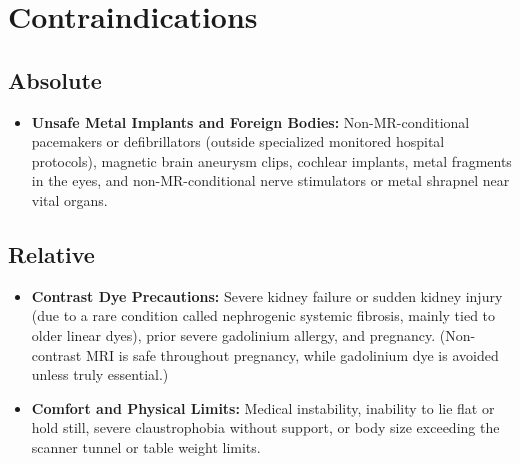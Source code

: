 \section{Contraindications}

\subsection{Absolute}
\begin{itemize}
\item \textbf{Unsafe Metal Implants and Foreign Bodies:} Non-MR-conditional pacemakers or defibrillators (outside specialized monitored hospital protocols), magnetic brain aneurysm clips, cochlear implants, metal fragments in the eyes, and non-MR-conditional nerve stimulators or metal shrapnel near vital organs.
\end{itemize}

\subsection{Relative}
\begin{itemize}
\item \textbf{Contrast Dye Precautions:} Severe kidney failure or sudden kidney injury (due to a rare condition called nephrogenic systemic fibrosis, mainly tied to older linear dyes), prior severe gadolinium allergy, and pregnancy. (Non-contrast MRI is safe throughout pregnancy, while gadolinium dye is avoided unless truly essential.)
\item \textbf{Comfort and Physical Limits:} Medical instability, inability to lie flat or hold still, severe claustrophobia without support, or body size exceeding the scanner tunnel or table weight limits.
\end{itemize}

